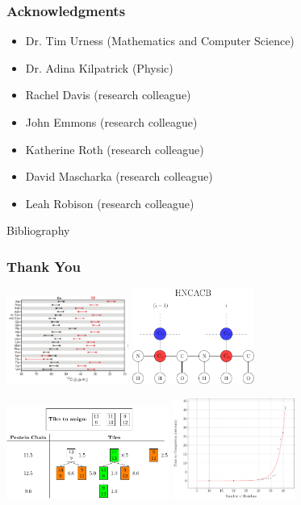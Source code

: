 \documentclass{beamer}
\begin{document}
\begin{frame}
	\frametitle{Acknowledgments}
	\begin{itemize}
		\item Dr. Tim Urness (Mathematics and Computer Science)
		\item Dr. Adina Kilpatrick (Physic)
		\item Rachel Davis (research colleague)
		\item John Emmons (research colleague)
		\item  Katherine Roth (research colleague)
		\item  David Mascharka (research colleague)
		\item  Leah Robison (research colleague)
	\end{itemize}
\end{frame}

\begin{frame}{Bibliography}


\end{frame}

\begin{frame}
	\frametitle{Thank You} 
	\begin{center}
	\includegraphics[width=0.3\textwidth]{carbon}\hspace{2em}
	\includegraphics[width=0.3\textwidth]{diagram}
	\end{center}
	\begin{center}
	\includegraphics[width=0.4\textwidth]{time_line}\hspace{2em}
	\includegraphics[width=0.3\textwidth]{plot}
\end{center}
\end{frame}
\end{document}
